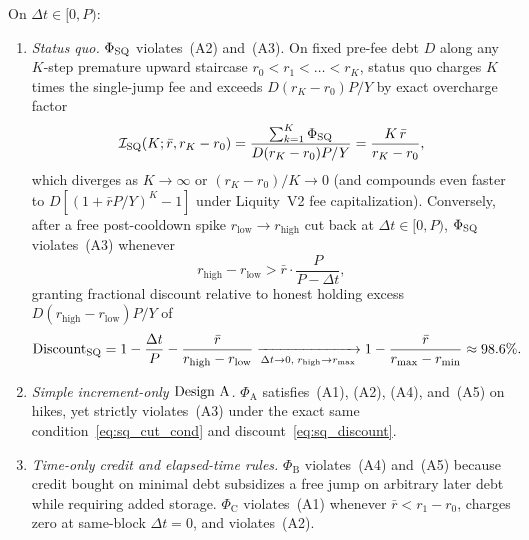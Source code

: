 \begin{theorem}\label{thm:failures}
On $\Delta t \in [0, P)$:
\begin{enumerate}[label=(\roman*), leftmargin=2.2em, itemsep=2pt]
\item \emph{Status quo.} $\Phi_{\mathrm{SQ}}$ violates~(A2) and~(A3). On fixed pre-fee debt $D$ along any $K$-step premature upward staircase $r_0 < r_1 < \dots < r_K$, status quo charges $K$ times the single-jump fee and exceeds $D(r_K - r_0)P/Y$ by exact overcharge factor
\begin{equation}\label{eq:sq_staircase}
\mathcal{I}_{\mathrm{SQ}}(K; \bar{r}, r_K - r_0) = \frac{\sum_{k=1}^K \Phi_{\mathrm{SQ}}}{D(r_K - r_0)P/Y} = \frac{K\,\bar{r}}{r_K - r_0},
\end{equation}
which diverges as $K \to \infty$ or $(r_K - r_0)/K \to 0$ (and compounds even faster to $D[(1 + \bar{r}P/Y)^K - 1]$ under Liquity~V2 fee capitalization). Conversely, after a free post-cooldown spike $r_{\mathrm{low}} \to r_{\mathrm{high}}$ cut back at $\Delta t \in [0, P)$, $\Phi_{\mathrm{SQ}}$ violates~(A3) whenever
\begin{equation}\label{eq:sq_cut_cond}
r_{\mathrm{high}} - r_{\mathrm{low}} > \bar{r}\cdot \frac{P}{P - \Delta t},
\end{equation}
granting fractional discount relative to honest holding excess $D(r_{\mathrm{high}} - r_{\mathrm{low}})P/Y$ of
\begin{equation}\label{eq:sq_discount}
\mathrm{Discount}_{\mathrm{SQ}} = 1 - \frac{\Delta t}{P} - \frac{\bar{r}}{r_{\mathrm{high}} - r_{\mathrm{low}}} \xrightarrow[\Delta t \to 0,\; r_{\mathrm{high}} \to r_{\max}]{} 1 - \frac{\bar{r}}{r_{\max} - r_{\min}} \approx 98.6\%.
\end{equation}
\item \emph{Simple increment-only $\textup{Design A}$.} $\Phi_{\mathrm{A}}$ satisfies~(A1), (A2), (A4), and~(A5) on hikes, yet strictly violates~(A3) under the exact same condition~\eqref{eq:sq_cut_cond} and discount~\eqref{eq:sq_discount}.
\item \emph{Time-only credit and elapsed-time rules.} $\Phi_{\mathrm{B}}$ violates~(A4) and~(A5) because credit bought on minimal debt subsidizes a free jump on arbitrary later debt while requiring added storage. $\Phi_{\mathrm{C}}$ violates~(A1) whenever $\bar{r} < r_1 - r_0$, charges zero at same-block $\Delta t = 0$, and violates~(A2).
\end{enumerate}
\end{theorem}

